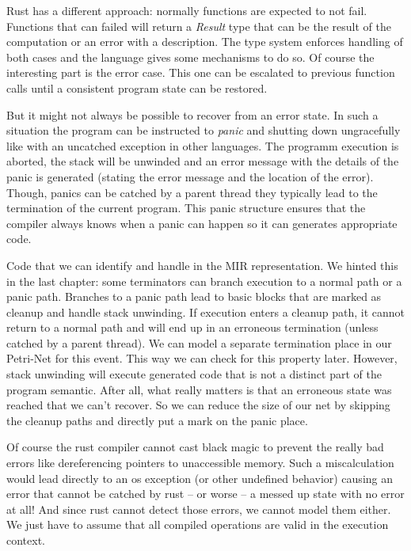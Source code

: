 Rust has a different approach: normally functions are expected to not fail.
Functions that can failed will return a \textit{Result} type that can be the result of the computation or an error with a description.
The type system enforces handling of both cases and the language gives some mechanisms to do so.
Of course the interesting part is the error case.
This one can be escalated to previous function calls until a consistent program state can be restored.

But it might not always be possible to recover from an error state.
In such a situation the program can be instructed to \textit{panic} and shutting down ungracefully like with an uncatched exception in other languages.
The programm execution is aborted, the stack will be unwinded and an error message with the details of the panic is generated (stating the error message and the location of the error).
Though, panics can be catched by a parent thread they typically lead to the termination of the current program.
This panic structure ensures that the compiler always knows when a panic can happen so it can generates appropriate code.

Code that we can identify and handle in the MIR representation.
We hinted this in the last chapter: some terminators can branch execution to a normal path or a panic path.
Branches to a panic path lead to basic blocks that are marked as cleanup and handle stack unwinding.
If execution enters a cleanup path, it cannot return to a normal path and will end up in an erroneous termination (unless catched by a parent thread).
We can model a separate termination place in our Petri-Net for this event.
This way we can check for this property later.
However, stack unwinding will execute generated code that is not a distinct part of the program semantic.
After all, what really matters is that an erroneous state was reached that we can't recover.
So we can reduce the size of our net by skipping the cleanup paths and directly put a mark on the panic place.

Of course the rust compiler cannot cast black magic to prevent the really bad errors like dereferencing pointers to unaccessible memory.
Such a miscalculation would lead directly to an os exception (or other undefined behavior) causing an error that cannot be catched by rust -- or worse -- a messed up state with no error at all!
And since rust cannot detect those errors, we cannot model them either.
We just have to assume that all compiled operations are valid in the execution context.

